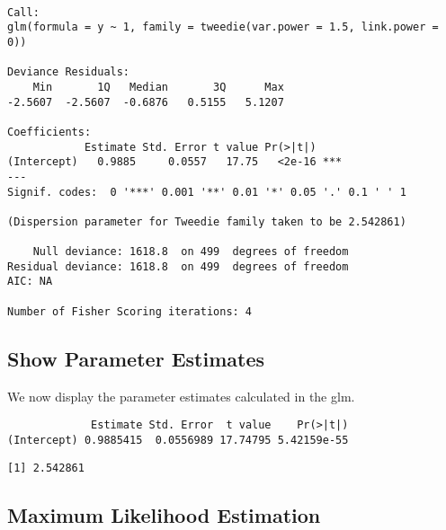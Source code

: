 \documentclass[]{book}
\newenvironment{Shaded}{\begin{snugshade}}{\end{snugshade}}
\newcommand{\KeywordTok}[1]{\textcolor[rgb]{0.13,0.29,0.53}{\textbf{#1}}}
\newcommand{\OperatorTok}[1]{\textcolor[rgb]{0.81,0.36,0.00}{\textbf{#1}}}
\newcommand{\NormalTok}[1]{#1}
\theoremstyle{definition}
\theoremstyle{definition}
\theoremstyle{definition}
\theoremstyle{remark}
\begin{document}
\begin{verbatim}

Call:
glm(formula = y ~ 1, family = tweedie(var.power = 1.5, link.power = 0))

Deviance Residuals: 
    Min       1Q   Median       3Q      Max  
-2.5607  -2.5607  -0.6876   0.5155   5.1207  

Coefficients:
            Estimate Std. Error t value Pr(>|t|)    
(Intercept)   0.9885     0.0557   17.75   <2e-16 ***
---
Signif. codes:  0 '***' 0.001 '**' 0.01 '*' 0.05 '.' 0.1 ' ' 1

(Dispersion parameter for Tweedie family taken to be 2.542861)

    Null deviance: 1618.8  on 499  degrees of freedom
Residual deviance: 1618.8  on 499  degrees of freedom
AIC: NA

Number of Fisher Scoring iterations: 4
\end{verbatim}

\subsection{Show Parameter Estimates}\label{show-parameter-estimates}

We now display the parameter estimates calculated in the glm.

\begin{Shaded}
\end{Shaded}

\begin{verbatim}
             Estimate Std. Error  t value    Pr(>|t|)
(Intercept) 0.9885415  0.0556989 17.74795 5.42159e-55
\end{verbatim}

\begin{Shaded}
\end{Shaded}

\begin{verbatim}
[1] 2.542861
\end{verbatim}

\subsection{Maximum Likelihood
Estimation}\label{maximum-likelihood-estimation}
\end{document}
